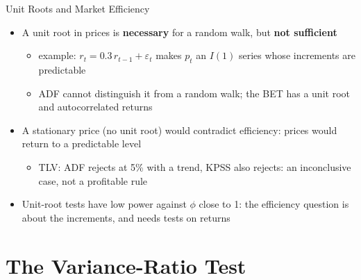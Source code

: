 \begin{frame}{Unit Roots and Market Efficiency}
\itemsize{\small}
\begin{itemize}
    \item A unit root in prices is \textbf{necessary} for a random walk, but \textbf{not sufficient}
    \begin{itemize}
        \item example: $r_t = 0.3\,r_{t-1} + \varepsilon_t$ makes $p_t$ an $I(1)$ series whose increments are predictable
        \item ADF cannot distinguish it from a random walk; the BET has a unit root and autocorrelated returns
    \end{itemize}
    \item A stationary price (no unit root) would contradict efficiency: prices would return to a predictable level
    \begin{itemize}
        \item TLV: ADF rejects at 5\% with a trend, KPSS also rejects: an inconclusive case, not a profitable rule
    \end{itemize}
    \item Unit-root tests have low power against $\phi$ close to 1: the efficiency question is about the increments, and needs tests on returns
\end{itemize}
\end{frame}


\section{The Variance-Ratio Test}

